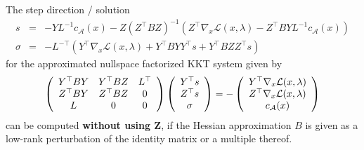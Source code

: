 \documentclass{svmult}
\begin{document}
\begin{theorem}	
	The step direction / solution
	\begin{eqnarray*}
		s&=& -YL^{-1}c_{\mathcal{A}}(x)-Z(Z^{\top}BZ)^{-1}(Z^{\top}\nabla_x \mathcal{L}(x,\lambda) -Z^{\top}BYL^{-1}c_{\mathcal{A}}(x))\\
		\sigma&=&-L^{-\top}(Y^{\top}\nabla_x \mathcal{L}(x,\lambda)+Y^{\top}BYY^{\top}s+Y^{\top}BZZ^{\top}s)
	\end{eqnarray*}
	for the approximated nullspace factorized KKT system given by
	\begin{equation*}
		\left( \begin{array}{c c c} Y^{\top}BY & Y^{\top}BZ &L^{\top}\\
			Z^{\top}BY & Z^{\top}BZ &0\\
		L&0&0 \end{array}\right)
		\left( \begin{array}{c} Y^{\top}s \\ Z^{\top}s \\ \sigma \end{array}\right)
		= - \left( \begin{array}{c} Y^{\top}\nabla_x \mathcal{L}(x,\lambda) \\ Z^{\top}\nabla_x \mathcal{L}(x,\lambda) \\c_{\mathcal{A}}(x) \end{array}\right)
	\end{equation*}
	can be computed \textbf{without using Z}, if the Hessian approximation $B$ is given as a low-rank perturbation of the identity matrix or a multiple thereof.
\end{theorem}
\end{document}
